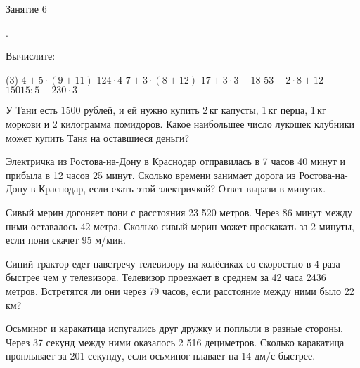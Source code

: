 \begin{class}[number=6]
	\begin{listofex}
		\item Занятие 6
	\end{listofex}
\end{class}

\begin{homework}[number=3]
	\begin{listofex}
		\item .
	\end{listofex}
\end{homework}

\begin{class}[number=7]
	\begin{listofex}
		\item Вычислите:
		\begin{tasks}(3)
			\task \( 4 + 5 \cdot (9 + 11) \)
			\task \( 124\cdot4 \)
			\task \( 7 + 3 \cdot (8 + 12) \)
			\task \( 17 + 3 \cdot 3 - 18 \)
			\task \( 53 - 2\cdot 8 + 12 \)
			\task \( 15015 : 5 - 230 \cdot 3 \)
		\end{tasks}
		\item У Тани есть 1500 рублей, и ей нужно купить 2 кг капусты, 1 кг перца, 1 кг моркови и 2 килограмма помидоров. Какое наибольшее число лукошек клубники может купить Таня на оставшиеся деньги?
		\begin{figure}[h]
		\end{figure}
		
		\item Электричка из Ростова-на-Дону в Краснодар отправилась в 7 часов 40 минут и прибыла в 12 часов 25 минут. Сколько времени занимает дорога из Ростова-на-Дону в Краснодар, если ехать этой электричкой? Ответ вырази в минутах.
		\item Сивый мерин догоняет пони с расстояния 23 520 метров. Через 86 минут между ними оставалось 42 метра. Сколько сивый мерин может проскакать за 2 минуты, если пони скачет 95 м/мин.
		\item Синий трактор едет навстречу телевизору на колёсиках со скоростью в 4 раза быстрее чем у телевизора. Телевизор проезжает в среднем за 42 часа 2436 метров. Встретятся ли они через 79  часов, если расстояние между ними было 22 км?
		\item Осьминог и каракатица испугались друг дружку и поплыли в разные стороны. Через 37 секунд между ними оказалось 2 516 дециметров. Сколько каракатица проплывает за 201 секунду, если осьминог плавает на 14 дм/с быстрее.
	\end{listofex}
\end{class}

